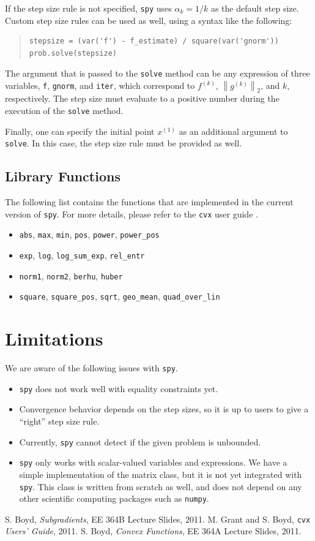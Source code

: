 \documentclass[12pt]{article}
\begin{document}
If the step size rule is not specified, \verb'spy' uses $\alpha_k = 1/k$ as the default step size. Custom step size rules can be used as well, using a syntax like the following:

\begin{quote}
\begin{verbatim}
stepsize = (var('f') - f_estimate) / square(var('gnorm'))
prob.solve(stepsize)
\end{verbatim}
\end{quote}

\noindent The argument that is passed to the \verb'solve' method can be any expression of three variables, \verb'f', \verb'gnorm', and \verb'iter', which correspond to $f^{(k)}$, $\left\|g^{(k)}\right\|_2$, and $k$, respectively. The step size must evaluate to a positive number during the execution of the \verb'solve' method.

Finally, one can specify the initial point $x^{(1)}$ as an additional argument to \verb'solve'. In this case, the step size rule must be provided as well.

\subsection{Library Functions}
\label{libfunctions}
The following list contains the functions that are implemented in the current version of \verb'spy'. For more details, please refer to the \verb'cvx' user guide \cite{guide}.
\begin{itemize}
\item \verb'abs', \verb'max', \verb'min', \verb'pos', \verb'power', \verb'power_pos'
\item \verb'exp', \verb'log', \verb'log_sum_exp', \verb'rel_entr'
\item \verb'norm1', \verb'norm2', \verb'berhu', \verb'huber'
\item \verb'square', \verb'square_pos', \verb'sqrt', \verb'geo_mean', \verb'quad_over_lin'
\end{itemize}

\section{Limitations}
We are aware of the following issues with \verb'spy'.
\begin{itemize}
\item \verb'spy' does not work well with equality constraints yet.
\item Convergence behavior depends on the step sizes, so it is up to users to give a ``right'' step size rule.
\item Currently, \verb'spy' cannot detect if the given problem is unbounded.
\item \verb'spy' only works with scalar-valued variables and expressions. We have a simple implementation of the matrix class, but it is not yet integrated with \verb'spy'. This class is written from scratch as well, and does not depend on any other scientific computing packages such as \verb'numpy'.
\end{itemize}


\begin{thebibliography}{99}
 S. Boyd, \emph{Subgradients}, EE 364B Lecture Slides, 2011.
 M. Grant and S. Boyd, \verb'cvx' \emph{Users' Guide}, 2011.
 S. Boyd, \emph{Convex Functions}, EE 364A Lecture Slides, 2011.
\end{thebibliography}
\end{document}
